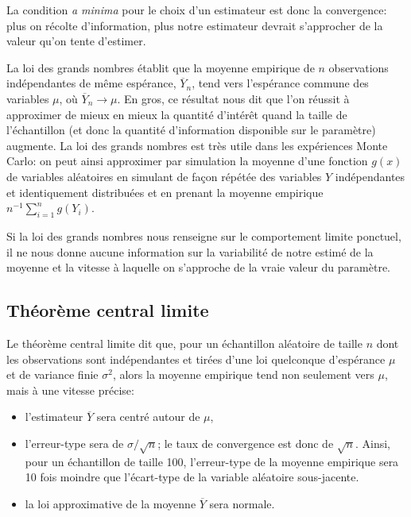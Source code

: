 \documentclass[
  11pt,
  letterpaper,
]{article}
\providecommand{\tightlist}{%
  \setlength{\itemsep}{0pt}\setlength{\parskip}{0pt}}
\theoremstyle{definition}
\theoremstyle{definition}
\theoremstyle{definition}
\theoremstyle{remark}
\begin{document}
La condition \emph{a minima} pour le choix d'un estimateur est donc la convergence: plus on récolte d'information, plus notre estimateur devrait s'approcher de la valeur qu'on tente d'estimer.

La loi des grands nombres établit que la moyenne empirique de \(n\) observations indépendantes de même espérance, \(\overline{Y}_n\), tend vers l'espérance commune des variables \(\mu\), où \(\overline{Y}_n \rightarrow \mu\). En gros, ce résultat nous dit que l'on réussit à approximer de mieux en mieux la quantité d'intérêt quand la taille de l'échantillon (et donc la quantité d'information disponible sur le paramètre) augmente. La loi des grands nombres est très utile dans les expériences Monte Carlo: on peut ainsi approximer par simulation la moyenne d'une fonction \(g(x)\) de variables aléatoires en simulant de façon répétée des variables \(Y\) indépendantes et identiquement distribuées et en prenant la moyenne empirique \(n^{-1} \sum_{i=1}^n g(Y_i)\).

Si la loi des grands nombres nous renseigne sur le comportement limite ponctuel, il ne nous donne aucune information sur la variabilité de notre estimé de la moyenne et la vitesse à laquelle on s'approche de la vraie valeur du paramètre.

\hypertarget{TCL}{%
\subsection{Théorème central limite}\label{TCL}}

Le théorème central limite dit que, pour un échantillon aléatoire de taille \(n\) dont les observations sont indépendantes et tirées d'une loi quelconque d'espérance \(\mu\) et de variance finie \(\sigma^2\), alors la moyenne empirique tend non seulement vers \(\mu\), mais à une vitesse précise:

\begin{itemize}
\tightlist
\item
  l'estimateur \(\overline{Y}\) sera centré autour de \(\mu\),
\item
  l'erreur-type sera de \(\sigma/\sqrt{n}\); le taux de convergence est donc de \(\sqrt{n}\). Ainsi, pour un échantillon de taille 100, l'erreur-type de la moyenne empirique sera 10 fois moindre que l'écart-type de la variable aléatoire sous-jacente.
\item
  la loi approximative de la moyenne \(\overline{Y}\) sera normale.
\end{itemize}
\end{document}
